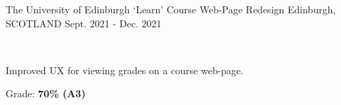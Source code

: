 \begin{cventries}
  \cventry
    {The University of Edinburgh} %
    {`Learn' Course Web-Page Redesign} %
    {Edinburgh, SCOTLAND} %
    {Sept. 2021 - Dec. 2021} %
    {
      \color{awesome}\color{graytext}\ \ \ \href{https://www.figma.com/proto/Q6wnTtZs5rP21QqnWcJBP6/G42-CW3?node-id=0\%3A1}{\faFigma\acvHeaderIconSep\@Prototype}
      \vspace{1.6em}
      \begin{cvitems} %
        \item Improved UX for viewing grades on a course web-page.
        \item Grade: \textbf{70\% (A3)}
      \end{cvitems}
    }
    
    

\end{cventries}
